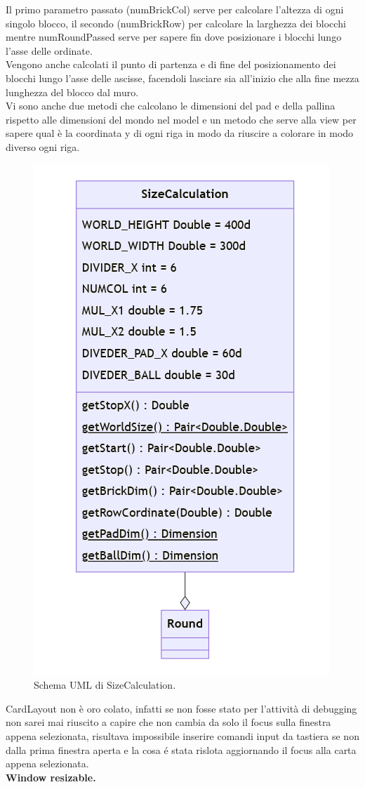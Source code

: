 \documentclass[a4paper,12pt]{report}
\begin{document}
Il primo parametro passato (numBrickCol) serve per calcolare l'altezza di ogni singolo blocco, il secondo (numBrickRow) per calcolare la larghezza dei blocchi
mentre numRoundPassed serve per sapere fin dove posizionare i blocchi lungo l'asse delle ordinate.
\\Vengono anche calcolati il punto di partenza e di fine del posizionamento dei blocchi lungo l'asse delle ascisse, facendoli lasciare sia all'inizio che alla fine mezza
lunghezza del blocco dal muro.
\\Vi sono anche due metodi che calcolano le dimensioni del pad e della pallina rispetto alle dimensioni del mondo nel model e un metodo che serve alla view per sapere qual è
la coordinata y di ogni riga in modo da riuscire a colorare in modo diverso ogni riga.
\begin{figure}[H]
    \centering{}
    \includegraphics[scale=0.5]{images/SizeCalculation.png}
    \caption{Schema UML di SizeCalculation.}
    \label{images:SizeCalculation}
\end{figure}CardLayout non è oro colato, infatti se non fosse stato per l'attività di debugging non sarei mai riuscito
a capire che non cambia da solo il focus sulla finestra appena selezionata, risultava impossibile
inserire comandi input da tastiera se non dalla prima finestra aperta e la cosa é stata rislota
aggiornando il focus alla carta appena selezionata.
\\
\textbf{Window resizable.}\\
\end{document}
